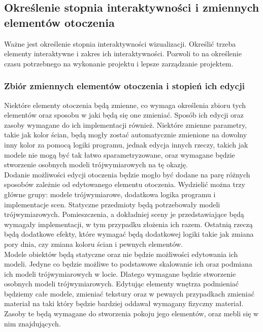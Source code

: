 \documentclass{article} %
\begin{document}
    \subsection{Określenie stopnia interaktywności i zmiennych elementów otoczenia}
        Ważne jest określenie stopnia interaktywności wizualizacji. Określić trzeba elementy interaktywne i zakres ich interaktywności. Pozwoli to na określenie czasu potrzebnego na wykonanie projektu i lepsze zarządzanie projektem. 
        \\
        
        \subsubsection{Zbiór zmiennych elementów otoczenia i stopień ich edycji}
        Niektóre elementy otoczenia będą zmienne, co wymaga określenia zbioru tych elementów oraz sposobu w jaki będą się one zmieniać. Sposób ich edycji oraz zasoby wymagane do ich implementacji również. Niektóre zmienne parametry, takie jak kolor ścian, będą mogły zostać automatycznie zmienione na dowolny inny kolor za pomocą logiki programu, jednak edycja innych rzeczy, takich jak modele nie mogą być tak łatwo sparametryzowane, oraz wymagane będzie stworzenie osobnych modeli trójwymiarowych na tę okazję.
        \\
        
        Dodanie możliwości edycji otoczenia będzie mogło być dodane na parę różnych sposobów zależnie od edytowanego elementu otoczenia. Wydzielić można trzy główne grupy: modele trójwymiarowe, dodatkowa logika programu i implementacje scen. Statyczne przedmioty będą potrzebowały modeli trójwymiarowych. Pomieszczenia, a dokładniej sceny je przedstawiające będą wymagały implementacji, w tym przypadku złożenia ich razem. Ostatnią rzeczą będą dodatkowe efekty, które wymagać będą dodatkowej logiki takie jak zmiana pory dnia, czy zmiana koloru ścian i pewnych elementów.
        \\
        
        Modele obiektów będą statyczne oraz nie będzie możliwości edytowania ich modeli. Jedyne co będzie możliwe to podstawowe skalowanie ich oraz podmiana ich modeli trójwymiarowych w locie. Dlatego wymagane będzie stworzenie osobnych modeli trójwymiarowych. Edytując elementy wnętrza podmieniać będziemy całe modele, zmieniać tekstury oraz w pewnych przypadkach zmieniać materiał na taki który będzie bardziej oddawał wymagany fizyczny materiał. Zasoby te będą wymagane do stworzenia pokoju jego elementów, oraz mebli się w nim znajdujących.
        \\
        
\end{document}
